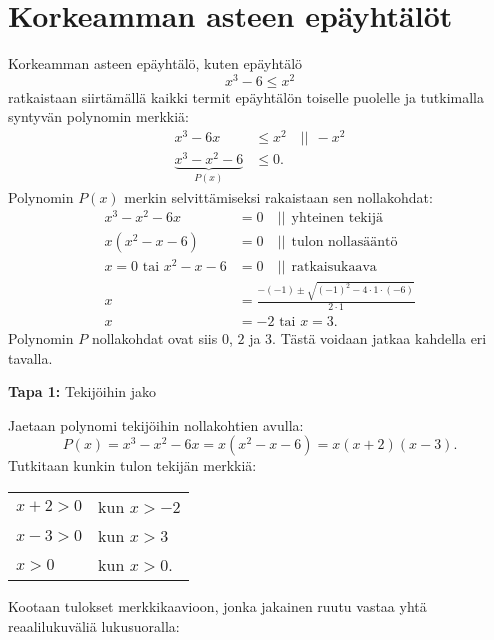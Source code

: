 \chapter{Korkeamman asteen epäyhtälöt}

Korkeamman asteen epäyhtälö, kuten epäyhtälö 
$$x^3 -6 \leq x^2 $$
ratkaistaan siirtämällä kaikki termit epäyhtälön toiselle puolelle ja tutkimalla
syntyvän polynomin merkkiä:
\begin{align*}
x^3 -6x &\leq x^2 \quad || \ \ -x^2 \\
\underbrace{x^3-x^2 -6}_{P(x)} &\leq 0.
\end{align*}
Polynomin $P(x)$ merkin selvittämiseksi rakaistaan sen nollakohdat:
\begin{align*}
x^3 - x^2-6x &= 0 \quad || \ \ \text{yhteinen tekijä} \\
x(x^2 -x -6) &= 0 \quad || \ \ \text{tulon nollasääntö} \\
x = 0 \textrm{ tai } x^2 -x -6 &= 0 \quad|| \ \ \text{ratkaisukaava} \\
x &=\frac{-(-1) \pm \sqrt{(-1)^2-4\cdot 1 \cdot (-6)}}{2\cdot 1} \\
x &= -2 \textrm{ tai } x = 3.
\end{align*}
Polynomin $P$ nollakohdat ovat siis $0$, $2$ ja $3$. Tästä voidaan jatkaa kahdella eri tavalla.

\textbf{Tapa 1:} Tekijöihin jako

Jaetaan polynomi tekijöihin nollakohtien avulla: 
$$P(x) = x^3 - x^2-6x = x(x^2-x-6) = x(x+2)(x-3).$$
Tutkitaan kunkin tulon tekijän merkkiä:\\
\quad \begin{tabular}{ll} 
$x+2>0$ & kun $x > -2$\\
$x-3>0$ & kun $x > 3$\\
$x>0$ & kun $x > 0$.
\end{tabular}

Kootaan tulokset merkkikaavioon, jonka jakainen ruutu vastaa
yhtä reaalilukuväliä lukusuoralla:

\begin{center}
\begin{merkkikaavio}{3}

	\merkkikaavioMerkki{$-$}
	\merkkikaavioMerkki{$+$}
	\merkkikaavioMerkki{$+$}
	\merkkikaavioMerkki{$+$}

\merkkikaavioUusirivi
	\merkkikaavioMerkki{$-$}
	\merkkikaavioMerkki{$-$}
	\merkkikaavioMerkki{$-$}
	\merkkikaavioMerkki{$+$}

\merkkikaavioUusirivi
	\merkkikaavioMerkki{$-$}
	\merkkikaavioMerkki{$-$}
	\merkkikaavioMerkki{$+$}
	\merkkikaavioMerkki{$+$}

\merkkikaavioUusiriviKaksoisviiva
	\merkkikaavioMerkki{$-$}
	\merkkikaavioMerkki{$+$}
	\merkkikaavioMerkki{$-$}
	\merkkikaavioMerkki{$+$}
\end{merkkikaavio}
\end{center}

